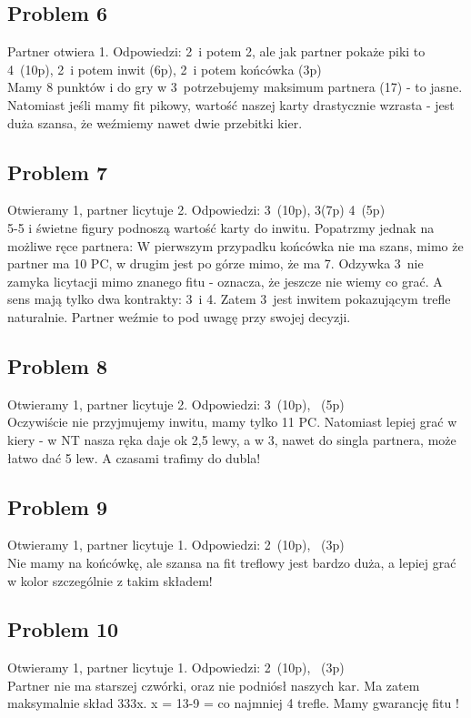 \documentclass[12pt, a4paper]{article}
\begin{document}
\subsection*{Problem 6}
Partner otwiera 1\nt.
Odpowiedzi: 2\clubs\ i potem 2\nt, ale jak partner pokaże piki to 4\spades\ (10p), 2\clubs\ i potem inwit (6p),
2\clubs\ i potem końcówka (3p) \\
Mamy 8 punktów i do gry w 3\nt\ potrzebujemy maksimum partnera (17) - to jasne. Natomiast jeśli 
mamy fit pikowy, wartość naszej karty drastycznie wzrasta - jest duża szansa, że weźmiemy nawet dwie przebitki kier.

\subsection*{Problem 7}
Otwieramy 1\hearts, partner licytuje 2\hearts.
Odpowiedzi: 3\clubs\ (10p), 3\hearts (7p) 4\hearts\ (5p) \\
5-5 i świetne figury podnoszą wartość karty do inwitu. Popatrzmy jednak na możliwe ręce partnera:
 \vspace{-5mm}
W pierwszym przypadku końcówka nie ma szans, mimo że partner ma 10 PC, w drugim jest po górze mimo, że ma 7.
Odzywka 3\clubs\ nie zamyka licytacji mimo znanego fitu - oznacza, że jeszcze nie wiemy co grać.
A sens mają tylko dwa kontrakty: 3\hearts\ i 4\hearts. Zatem 3\clubs\ jest inwitem pokazującym trefle naturalnie.
Partner weźmie to pod uwagę przy swojej decyzji.

\subsection*{Problem 8}
Otwieramy 1\hearts, partner licytuje 2\nt.
Odpowiedzi: 3\hearts\ (10p), \pass\ (5p) \\
Oczywiście nie przyjmujemy inwitu, mamy tylko 11 PC. Natomiast lepiej grać w kiery - w NT 
nasza ręka daje ok 2,5 lewy, a w 3\hearts, nawet do singla partnera, może łatwo dać 5 lew.
A czasami trafimy do dubla! 

\subsection*{Problem 9}
Otwieramy 1\hearts, partner licytuje 1\nt.
Odpowiedzi: 2\clubs\ (10p), \pass\ (3p) \\
Nie mamy na końcówkę, ale szansa na fit treflowy jest bardzo duża, a lepiej grać w kolor szczególnie z takim składem!

\subsection*{Problem 10}
Otwieramy 1\diams, partner licytuje 1\nt.
Odpowiedzi: 2\clubs\ (10p), \pass\ (3p) \\
Partner nie ma starszej czwórki, oraz nie podniósł naszych kar. Ma zatem maksymalnie skład 333x.
x = 13-9 = co najmniej 4 trefle. Mamy gwarancję fitu \clubs!
\end{document}
